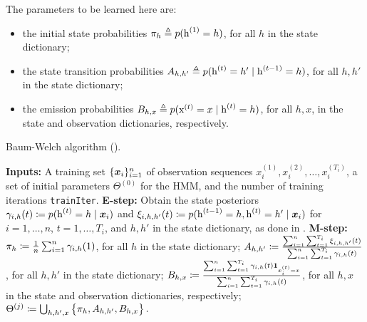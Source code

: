 The parameters to be learned here are:
\begin{itemize}
    \item the initial state probabilities ${\pi}_h \triangleq p({\textnormal{h}}^{(1)}=h)$, for all $h$ in the state dictionary;
    \item the state transition probabilities ${A}_{h,h'} \triangleq p({\textnormal{h}}^{(t)}=h' \mid {\textnormal{h}}^{(t-1)}=h)$, for all $h,h'$ in the state dictionary;
    \item the emission probabilities ${B}_{h,x} \triangleq p({\textnormal{x}}^{(t)}=x \mid {\textnormal{h}}^{(t)}=h)$, for all $h, x$, in the state and observation dictionaries, respectively.
\end{itemize}

\begin{algorithm}
    \caption{Baum-Welch algorithm (\citet{Baum1972}).}
    \label{alg:baum_welch}
    \begin{algorithmic}[1]
        \State \textbf{Inputs:} A training set $\lbrace {\bm{x}}_i \rbrace_{i=1}^n$ of observation sequences $x_i^{(1)}, x_i^{(2)}, \dots, x_i^{(T_i)}$, a set of initial parameters $\Theta^{(0)}$ for the HMM, and the number of training iterations \texttt{trainIter}.
        \vspace{0.01cm}
        \vspace{0.3cm}
        \State \textbf{E-step:}
        \vspace{0.3cm}
        \Indent
        \State Obtain the state posteriors $\gamma_{i,h}(t) \coloneqq p({\textnormal{h}}^{(t)}=h \mid {\bm{x}}_i)$ and $\xi_{i,h,h'}(t) \coloneqq p({\textnormal{h}}^{(t-1)}=h, {\textnormal{h}}^{(t)}=h' \mid {\bm{x}}_i)$ for $i=1,\dots,n$, $t=1,\dots,T_i$, and $h,h'$ in the state dictionary, as done in .
        \vspace{0.3cm}
        \EndIndent
        \State \textbf{M-step:}
        \vspace{0.3cm}
        \Indent
        \State ${\pi}_h \coloneqq \frac{1}{n} \sum_{i=1}^n \gamma_{i,h}(1)$, for all $h$ in the state dictionary;
        \vspace{0.3cm}
        \State ${A}_{h,h'} \coloneqq \frac{\sum_{i=1}^n \sum_{t=1}^{T_i}\xi_{i,h,h'}(t)}{\sum_{i=1}^n \sum_{t=1}^{T_i} \gamma_{i,h}(t)}$, for all $h,h'$ in the state dictionary;
        \vspace{0.3cm}
        \State ${B}_{h,x} \coloneqq \frac{\sum_{i=1}^n \sum_{t=1}^{T_i} \gamma_{i,h}(t) \bm{1}_{x_i^{(t)}=x}}{\sum_{i=1}^n \sum_{t=1}^{T_i} \gamma_{i,h}(t)}$, for all $h,x$ in the state and observation dictionaries, respectively;
        \vspace{0.3cm}
        \State $\Theta^{(j)} \coloneqq \bigcup_{h,h',x} \left\lbrace {\pi}_h, {A}_{h,h'}, {B}_{h,x} \right\rbrace.$
        \EndIndent
        \EndFor
    \end{algorithmic}
\end{algorithm}


